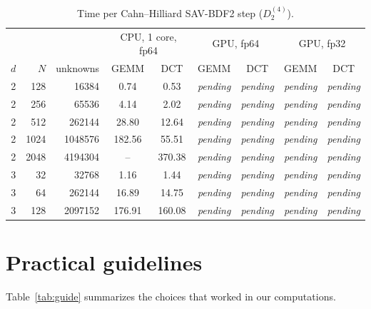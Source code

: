 \documentclass[preprint,12pt]{elsarticle}
\theoremstyle{remark}
\begin{document}
\begin{table}[t]\centering\footnotesize
\caption{Time per Cahn--Hilliard SAV-BDF2 step ($D_2^{(4)}$).}\label{tab:perf}
\begin{tabular}{rr r cc cc cc}
\toprule
 & & & \multicolumn{2}{c}{CPU, 1 core, fp64} & \multicolumn{2}{c}{GPU, fp64} & \multicolumn{2}{c}{GPU, fp32}\\
$d$ & $N$ & unknowns & GEMM & DCT & GEMM & DCT & GEMM & DCT\\
\midrule
2 & 128 & 16384 & 0.74 & 0.53 & \textit{pending} & \textit{pending} & \textit{pending} & \textit{pending}\\
2 & 256 & 65536 & 4.14 & 2.02 & \textit{pending} & \textit{pending} & \textit{pending} & \textit{pending}\\
2 & 512 & 262144 & 28.80 & 12.64 & \textit{pending} & \textit{pending} & \textit{pending} & \textit{pending}\\
2 & 1024 & 1048576 & 182.56 & 55.51 & \textit{pending} & \textit{pending} & \textit{pending} & \textit{pending}\\
2 & 2048 & 4194304 & -- & 370.38 & \textit{pending} & \textit{pending} & \textit{pending} & \textit{pending}\\
3 & 32 & 32768 & 1.16 & 1.44 & \textit{pending} & \textit{pending} & \textit{pending} & \textit{pending}\\
3 & 64 & 262144 & 16.89 & 14.75 & \textit{pending} & \textit{pending} & \textit{pending} & \textit{pending}\\
3 & 128 & 2097152 & 176.91 & 160.08 & \textit{pending} & \textit{pending} & \textit{pending} & \textit{pending}\\
\bottomrule
\end{tabular}
\end{table}

\section{Practical guidelines}\label{sec:guide}
Table~\ref{tab:guide} summarizes the choices that worked in our computations.
\end{document}
